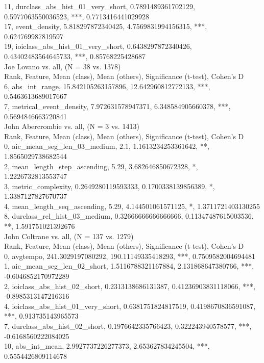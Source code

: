 11, durclass_abs_hist_01_very_short, 0.7891489361702129, 0.5977063550036523, ***, 0.7713416441029928\\
17, event_density, 5.818297872340425, 4.7569831994156315, ***, 0.624769987819597\\
19, ioiclass_abs_hist_01_very_short, 0.6438297872340426, 0.43402483564645733, ***, 0.85768225428687\\
Joe Lovano vs. all, (N = 38 vs. 1378)\\
Rank, Feature, Mean (class), Mean (others), Significance (t-test), Cohen's D\\
6, abs_int_range, 15.842105263157896, 12.642960812772133, ***, 0.5463613689017667\\
7, metrical_event_density, 7.972631578947371, 6.348584905660378, ***, 0.5694846663720841\\
John Abercrombie vs. all, (N = 3 vs. 1413)\\
Rank, Feature, Mean (class), Mean (others), Significance (t-test), Cohen's D\\
0, aic_mean_seg_len_03_medium, 2.1, 1.1613234253361642, **, 1.8565029738682544\\
2, mean_length_step_ascending, 5.29, 3.682646850672328, *, 1.2226732813553747\\
3, metric_complexity, 0.2649280119593333, 0.1700338139856389, *, 1.3387127827670737\\
4, mean_length_seq_ascending, 5.29, 4.144501061571125, *, 1.3711721403130255\\
8, durclass_rel_hist_03_medium, 0.32666666666666666, 0.11347487615003536, **, 1.591751021392676\\
John Coltrane vs. all, (N = 137 vs. 1279)\\
Rank, Feature, Mean (class), Mean (others), Significance (t-test), Cohen's D\\
0, avgtempo, 241.3029197080292, 190.11149335418293, ***, 0.7509582004694481\\
1, aic_mean_seg_len_02_short, 1.5116788321167884, 2.131868647380766, ***, -0.6046852170972289\\
2, ioiclass_abs_hist_02_short, 0.2313138686131387, 0.41236903831118066, ***, -0.8985313147216316\\
4, ioiclass_abs_hist_01_very_short, 0.6381751824817519, 0.4198670836591087, ***, 0.913735143965573\\
7, durclass_abs_hist_02_short, 0.1976642335766423, 0.322243940578577, ***, -0.6168560222084025\\
10, abs_int_mean, 2.9927737226277373, 2.653627834245504, ***, 0.5554426809114678\\
